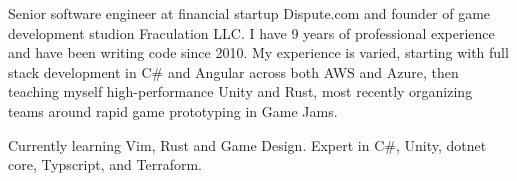 

\begin{cvparagraph}

Senior software engineer at financial startup Dispute.com and founder of game development studion Fraculation LLC.\@
I have 9 years of professional experience and have been writing code since 2010. My experience is varied, starting with 
full stack development in C\# and Angular across both AWS and Azure, then teaching myself high-performance Unity and Rust,
most recently organizing teams around rapid game prototyping in Game Jams.

Currently learning Vim, Rust and Game Design. Expert in C\#, Unity, dotnet core, Typscript, and Terraform.

\end{cvparagraph}
